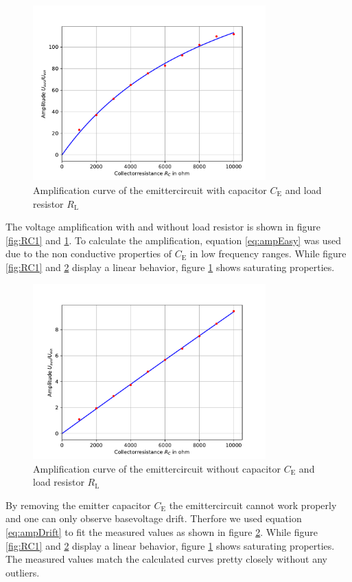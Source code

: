\documentclass[11pt, a4paper]{article}
\begin{document}
\begin{figure}[h]
    \centering
    \includegraphics[width=0.8\textwidth]{plots/RC3.pdf}
    \caption{Amplification curve of the emittercircuit with capacitor $C_{\text{E}}$ and load resistor $R_{\text{L}}$}
    \label{fig:RC3}
\end{figure}
The voltage amplification with and without load resistor is shown in figure \ref{fig:RC1} and \ref{fig:RC3}. To calculate the amplification, equation \ref{eq:ampEasy} was used due to the non conductive properties of $C_{\text{E}}$ in low frequency ranges.
While figure \ref{fig:RC1} and \ref{fig:RC2} display a linear behavior, figure \ref{fig:RC3} shows saturating properties.


\begin{figure}[h]
    \centering
    \includegraphics[width=0.8\textwidth]{plots/RC2.pdf}
    \caption{Amplification curve of the emittercircuit without capacitor $C_{\text{E}}$ and load resistor $R_{\text{L}}$}
    \label{fig:RC2}
\end{figure}
By removing the emitter capacitor $C_{\text{E}}$ the emittercircuit cannot work properly and one can only observe basevoltage drift. Therfore we used equation \ref{eq:ampDrift} to fit the measured values as shown in figure \ref{fig:RC2}.
While figure \ref{fig:RC1} and \ref{fig:RC2} display a linear behavior, figure \ref{fig:RC3} shows saturating properties.
The measured values match the calculated curves pretty closely without any outliers.
\end{document}
